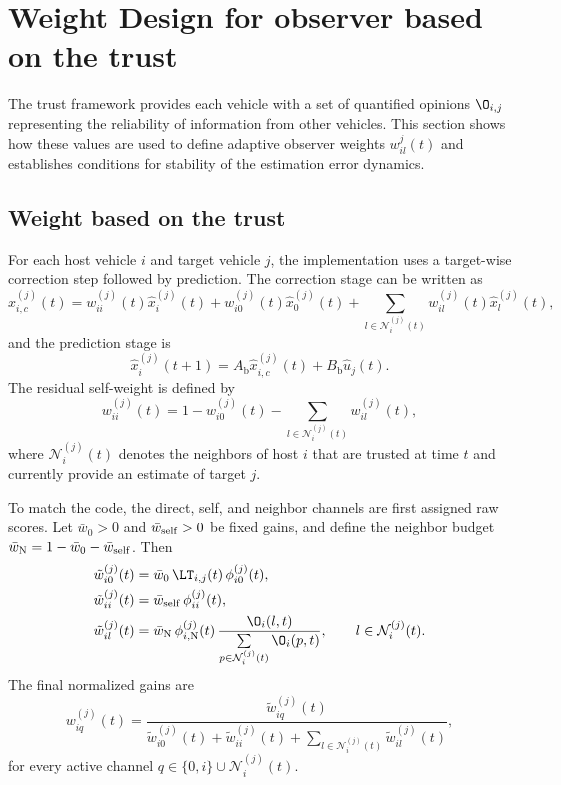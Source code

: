 \section{Weight Design for observer based on the trust}\label{sec_Weigth_Design}
The trust framework provides each vehicle with a set of quantified opinions $\O_{i,j}$ representing the reliability of information from other vehicles.
This section shows how these values are used to define adaptive observer weights $w_{il}^{j}(t)$ and establishes conditions for stability of the estimation error dynamics.

\subsection{Weight based on the trust}
For each host vehicle $i$ and target vehicle $j$, the implementation uses a target-wise correction step followed by prediction. The correction stage can be written as
\begin{equation}\label{eq:code_correction}
\hat{x}_{i,c}^{(j)}(t)=
w_{ii}^{(j)}(t)\hat{x}_{i}^{(j)}(t)
+w_{i0}^{(j)}(t)\hat{x}_{0}^{(j)}(t)
+\sum_{l\in \mathcal{N}_{i}^{(j)}(t)} w_{il}^{(j)}(t)\hat{x}_{l}^{(j)}(t),
\end{equation}
and the prediction stage is
\begin{equation}\label{eq:code_prediction}
\hat{x}_{i}^{(j)}(t+1)=A_{\text{b}}\hat{x}_{i,c}^{(j)}(t)+B_{\text{b}}\hat{u}_{j}(t).
\end{equation}
The residual self-weight is defined by
\begin{equation}\label{eq:self_weight}
w_{ii}^{(j)}(t)=1-w_{i0}^{(j)}(t)-\sum_{l\in\mathcal{N}_{i}^{(j)}(t)}w_{il}^{(j)}(t),
\end{equation}
where $\mathcal{N}_{i}^{(j)}(t)$ denotes the neighbors of host $i$ that are trusted at time $t$ and currently provide an estimate of target $j$.

To match the code, the direct, self, and neighbor channels are first assigned raw scores. Let $\bar w_0>0$ and $\bar w_{\rm self}>0$ be fixed gains, and define the neighbor budget $\bar w_{\rm N}=1-\bar w_0-\bar w_{\rm self}$. Then
\begin{subequations}\label{eq:raw_weights}
\begin{align}
\tilde{w}_{i0}^{(j)}(t) &= \bar w_0\,\LT_{i,j}(t)\,\phi_{i0}^{(j)}(t),\\
\tilde{w}_{ii}^{(j)}(t) &= \bar w_{\rm self}\,\phi_{ii}^{(j)}(t),\\
\tilde{w}_{il}^{(j)}(t) &= \bar w_{\rm N}\,\phi_{i,\mathrm{N}}^{(j)}(t)\,
\frac{\O_i(l,t)}{\sum\limits_{p\in\mathcal{N}_{i}^{(j)}(t)}\O_i(p,t)},
\qquad l\in\mathcal{N}_{i}^{(j)}(t).
\end{align}
\end{subequations}
The final normalized gains are
\begin{equation}\label{design_gain}
w_{iq}^{(j)}(t)=
\frac{\tilde{w}_{iq}^{(j)}(t)}
{\tilde{w}_{i0}^{(j)}(t)+\tilde{w}_{ii}^{(j)}(t)+\sum_{l\in\mathcal{N}_{i}^{(j)}(t)}\tilde{w}_{il}^{(j)}(t)},
\end{equation}
for every active channel $q\in\{0,i\}\cup\mathcal{N}_{i}^{(j)}(t)$.

